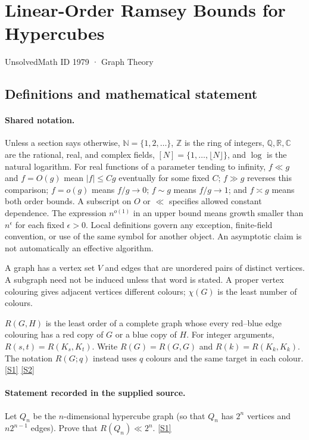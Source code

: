 \documentclass[11pt,a4paper]{article}
\newcommand{\N}{\mathbb{N}}
\newcommand{\Z}{\mathbb{Z}}
\newcommand{\Q}{\mathbb{Q}}
\newcommand{\R}{\mathbb{R}}
\newcommand{\C}{\mathbb{C}}
\newcommand{\sref}[2]{\hyperlink{source:#1:#2}{[S#2]}}
\begin{document}

\setcounter{section}{1978}

\section{Linear-Order Ramsey Bounds for Hypercubes}\label{1979}

{\small\sffamily UnsolvedMath ID 1979 · Graph Theory}

\subsection{Definitions and mathematical statement}

\paragraph{Shared notation.}Unless a section says otherwise, $\N=\{1,2,\ldots\}$,
$\Z$ is the ring of integers, $\Q,\R,\C$ are the rational, real, and complex
fields, $[N]=\{1,\ldots,\lfloor N\rfloor\}$, and $\log$ is the natural
logarithm. For real functions of a parameter tending to infinity,
$f\ll g$ and $f=O(g)$ mean $|f|\leq Cg$ eventually for some fixed $C$;
$f\gg g$ reverses this comparison; $f=o(g)$ means $f/g\to0$;
$f\sim g$ means $f/g\to1$; and $f\asymp g$ means both order bounds.
A subscript on $O$ or $\ll$ specifies allowed constant dependence.
The expression $n^{o(1)}$ in an upper bound means growth smaller than
$n^\epsilon$ for each fixed $\epsilon>0$. Local definitions govern any
exception, finite-field convention, or use of the same symbol for another
object. An asymptotic claim is not automatically an effective algorithm.



A graph has a vertex set $V$ and edges that are unordered pairs of distinct vertices. A subgraph need not be induced unless that word is stated. A proper vertex colouring gives adjacent vertices different colours; $\chi(G)$ is the least number of colours.

$R(G,H)$ is the least order of a complete graph whose every red--blue edge colouring has a red copy of $G$ or a blue copy of $H$. For integer arguments, $R(s,t)=R(K_s,K_t)$. Write $R(G)=R(G,G)$ and $R(k)=R(K_k,K_k)$. The notation $R(G;q)$ instead uses $q$ colours and the same target in each colour. \sref{1979}{1} \sref{1979}{2}

\paragraph{Statement recorded in the supplied source.}
Let $Q_n$ be the $n$-dimensional hypercube graph (so that $Q_n$ has $2^n$ vertices and $n2^{n-1}$ edges). Prove that $ R(Q_n) \ll 2^n. $ \sref{1979}{1}
\end{document}
